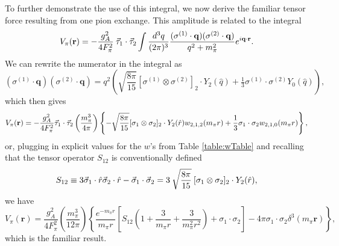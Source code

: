 To further demonstrate the use of this integral, we now derive the familiar tensor force resulting from one pion exchange. This amplitude is related to the integral
\begin{equation} 
V_\pi( \mathbf{r}) =  -\frac{g_A^2 }{4 F_\pi^2} \:\vec{\tau}_1\cdot\vec{\tau}_2 \int \frac{d^3 q } {(2 \pi)^3 } \frac{(\sigma^{(1)} \cdot \mathbf{q} ) (\sigma^{(2)} \cdot \mathbf{q} ) } {q^2+m_\pi^2} e^{i \mathbf{q} \cdot \mathbf{r} }. 
\end{equation}
We can rewrite the numerator in the integral as
\begin{equation} (\sigma^{(1)} \cdot \mathbf{q}) ( \sigma^{(2)} \cdot \mathbf{q} )= q^2 \left(\sqrt{\frac{8\pi}{15}} [\sigma^{(1)} \otimes \sigma^{(2)}]_2 \cdot Y_2(\hat{q}) + \tfrac{1}{3} \sigma^{(1)} \cdot \sigma^{(2)}  Y_0(\hat{q}) \right),\end{equation}
which then gives
\begin{equation} 
V_\pi( \mathbf{r}) = - \frac{g_A^2 }{4 F_\pi^2} \vec{\tau}_1\cdot\vec{\tau}_2 \left(\frac{m_\pi^3}{4 \pi}\right) \left\{ - \sqrt{\frac{8\pi}{15}} [\sigma_1 \otimes \sigma_2]_2 \cdot Y_2(\hat{r}) w_{2,1,2}(m_\pi r) + \frac{1}{3} \sigma_1 \cdot \sigma_2 w_{2,1,0}(m_\pi r ) \right\},  \end{equation}
or, plugging in explicit values for the $w$'s from Table \ref{table:wTable} and recalling that the tensor operator $S_{12}$ is conventionally defined
\begin{equation}
S_{12} \equiv   3\vec{\sigma}_1\cdot \hat{r}\vec{\sigma}_2\cdot \hat{r} -\vec{\sigma}_1\cdot\vec{\sigma}_2 = 3\:\sqrt{\frac{8\pi}{15}} \:[\sigma_1 \otimes \sigma_2]_2 \cdot Y_2(\hat{r}) , 
\end{equation}
we have
\begin{equation} V_\pi( \mathbf{r})= \frac{g_A^2 }{4 F_\pi^2}  \left(\frac{m_\pi^3}{12 \pi}\right) \left\{ \frac{e^{-m_\pi r}}{m_\pi r} \left[ S_{12}\left(1+\frac{3}{m_\pi r}+ \frac{3}{m_\pi^2 r^2} \right) +  \sigma_1 \cdot \sigma_2 \right] - 4\pi  \sigma_1 \cdot \sigma_2 \delta^3(m_\pi \mathbf{r}) \right\}, 
\end{equation}
which is the familiar result.

